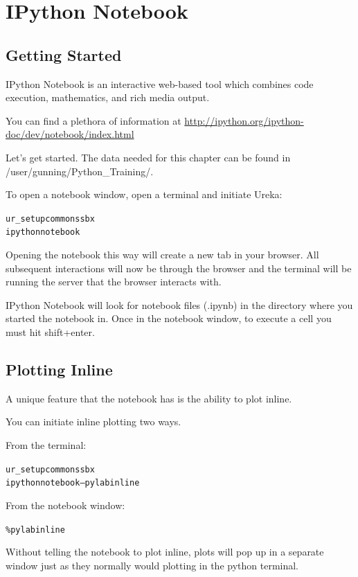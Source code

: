 \chapter{IPython Notebook}
\label{ch:notebook}

\section{Getting Started}

IPython Notebook is an interactive web-based tool which combines code execution, mathematics, and rich media output.

You can find a plethora of information at \url{http://ipython.org/ipython-doc/dev/notebook/index.html}

Let's get started.  The data needed for this chapter can be found in /user/gunning/Python\_Training/.

To open a notebook window, open a terminal and initiate Ureka:

\begin{alltt}
\termtab ur_setup common ssbx
\termtab ipython notebook
\end{alltt}

Opening the notebook this way will create a new tab in your browser. All subsequent interactions will now
be through the browser and the terminal will be running the server that the browser interacts with.

IPython Notebook will look for notebook files (.ipynb) in the directory where you started the notebook in.
Once in the notebook window, to execute a cell you must hit shift+enter.

\section{Plotting Inline}

A unique feature that the notebook has is the ability to plot inline.

You can initiate inline plotting two ways.

From the terminal:
\begin{alltt}
\termtab ur_setup common ssbx
\termtab ipython notebook --pylab inline
\end{alltt}

From the notebook window:
\begin{alltt}
\pytab \%pylab inline
\end{alltt}

Without telling the notebook to plot inline, plots will pop up in a separate window just as they normally
would plotting in the python terminal.

